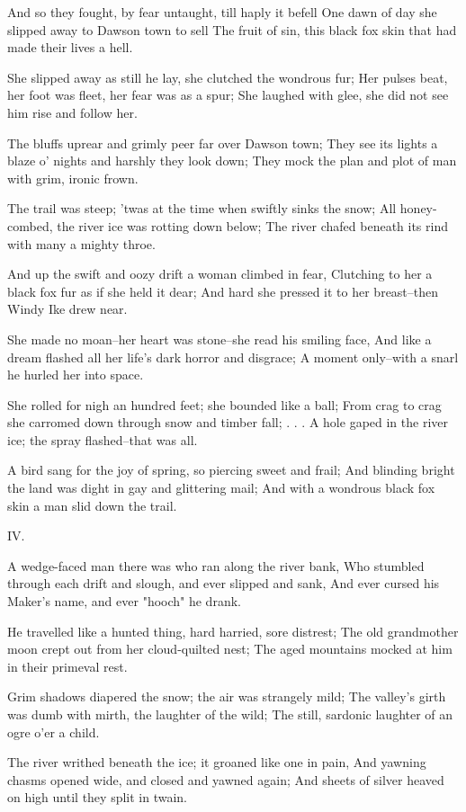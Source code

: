 \begin{poemblock}
 And so they fought, by fear untaught, till haply it befell
 One dawn of day she slipped away to Dawson town to sell
 The fruit of sin, this black fox skin that had made their lives a hell.

 She slipped away as still he lay, she clutched the wondrous fur;
 Her pulses beat, her foot was fleet, her fear was as a spur;
 She laughed with glee, she did not see him rise and follow her.

 The bluffs uprear and grimly peer far over Dawson town;
 They see its lights a blaze o' nights and harshly they look down;
 They mock the plan and plot of man with grim, ironic frown.

 The trail was steep; 'twas at the time when swiftly sinks the snow;
 All honey-combed, the river ice was rotting down below;
 The river chafed beneath its rind with many a mighty throe.

 And up the swift and oozy drift a woman climbed in fear,
 Clutching to her a black fox fur as if she held it dear;
 And hard she pressed it to her breast--then Windy Ike drew near.

 She made no moan--her heart was stone--she read his smiling face,
 And like a dream flashed all her life's dark horror and disgrace;
 A moment only--with a snarl he hurled her into space.

 She rolled for nigh an hundred feet; she bounded like a ball;
 From crag to crag she carromed down through snow and timber fall; . . .
 A hole gaped in the river ice; the spray flashed--that was all.

 A bird sang for the joy of spring, so piercing sweet and frail;
 And blinding bright the land was dight in gay and glittering mail;
 And with a wondrous black fox skin a man slid down the trail.


 IV.

 A wedge-faced man there was who ran along the river bank,
 Who stumbled through each drift and slough, and ever slipped and sank,
 And ever cursed his Maker's name, and ever "hooch" he drank.

 He travelled like a hunted thing, hard harried, sore distrest;
 The old grandmother moon crept out from her cloud-quilted nest;
 The aged mountains mocked at him in their primeval rest.

 Grim shadows diapered the snow; the air was strangely mild;
 The valley's girth was dumb with mirth, the laughter of the wild;
 The still, sardonic laughter of an ogre o'er a child.

 The river writhed beneath the ice; it groaned like one in pain,
 And yawning chasms opened wide, and closed and yawned again;
 And sheets of silver heaved on high until they split in twain.


\end{poemblock}
